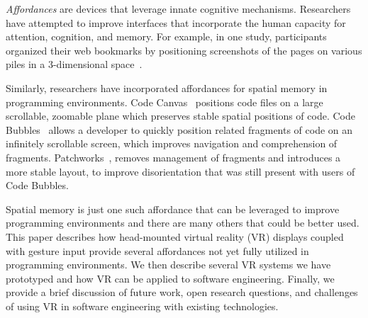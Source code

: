 \documentclass[conference]{IEEEtran}
\begin{document}
\emph{Affordances} are devices that leverage innate cognitive mechanisms.
Researchers have attempted to improve interfaces that incorporate the human capacity for attention, cognition, and memory.
For example, in one study, participants organized their web bookmarks by positioning screenshots of the pages on various piles in a 3-dimensional space~\cite{Robertson:1998}. 

Similarly, researchers have incorporated affordances for spatial memory in programming environments.  Code Canvas~\cite{DeLine:CodeCanvas} positions code files on a large scrollable, zoomable plane which preserves stable spatial positions of code.  Code Bubbles~\cite{Bragdon:CodeBubbles} allows a developer to quickly position related fragments of code on an infinitely scrollable screen, which improves navigation and comprehension of fragments.  Patchworks~\cite{Henley:2014}, removes management of fragments and introduces a more stable layout, to improve disorientation that was still present with users of Code Bubbles.



Spatial memory is just one such affordance that can be leveraged to improve programming environments and there are many others that could be better used. 
This paper describes how head-mounted virtual reality (VR) displays coupled with gesture input provide several affordances not yet fully utilized in programming environments.
We then describe several VR systems we have prototyped and how VR can be applied to software engineering.  Finally, we provide a brief discussion of future work, open research questions, and challenges of using VR in software engineering with existing technologies.


\end{document}
